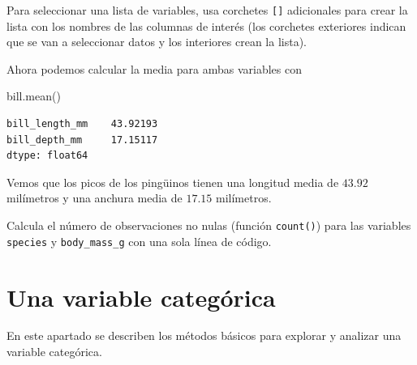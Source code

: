 \documentclass[
  a4paper,
  noprof,
  12pt,
  notoc,
  nosols,
  nobib]{mnye}
\newenvironment{Shaded}{\begin{snugshade}}{\end{snugshade}}
\newcommand{\NormalTok}[1]{\textcolor[rgb]{0.00,0.23,0.31}{#1}}
\renewenvironment{exercise}[1][]{
            \if\relax\detokenize{#1}\relax
                \ex
            \else
                \ex[note={#1}]
            \fi
        }{\endex}
\theoremstyle{definition}
\newtheorem{exercise}{Ejercicio}[section]
\theoremstyle{remark}
\begin{document}
\begin{tcolorbox}[enhanced jigsaw, colframe=quarto-callout-note-color-frame, rightrule=.15mm, breakable, left=2mm, bottomrule=.15mm, arc=.35mm, leftrule=.75mm, opacityback=0, toprule=.15mm, colback=white]
\begin{minipage}[t]{5.5mm}
\textcolor{quarto-callout-note-color}{\faInfo}
\end{minipage}%
\begin{minipage}[t]{\textwidth - 5.5mm}

Para seleccionar una lista de variables, usa corchetes \texttt{{[}{]}}
adicionales para crear la lista con los nombres de las columnas de
interés (los corchetes exteriores indican que se van a seleccionar datos
y los interiores crean la lista).

\end{minipage}%
\end{tcolorbox}

Ahora podemos calcular la media para ambas variables con

\begin{Shaded}
\begin{Highlighting}[]
\NormalTok{bill.mean()}
\end{Highlighting}
\end{Shaded}

\begin{verbatim}
bill_length_mm    43.92193
bill_depth_mm     17.15117
dtype: float64
\end{verbatim}

Vemos que los picos de los pingüinos tienen una longitud media de
\(43.92\) milímetros y una anchura media de \(17.15\) milímetros.

\begin{exercise}[]%
\protect\hypertarget{exr-subset-variables-3}{}\label{exr-subset-variables-3}%
Calcula el número de observaciones no nulas (función \texttt{count()})
para las variables \texttt{species} y \texttt{body\_mass\_g} con una
sola línea de código.

\end{exercise}


\section{Una variable categórica}\label{una-variable-categuxf3rica}

En este apartado se describen los métodos básicos para explorar y
analizar una variable categórica.
\end{document}
